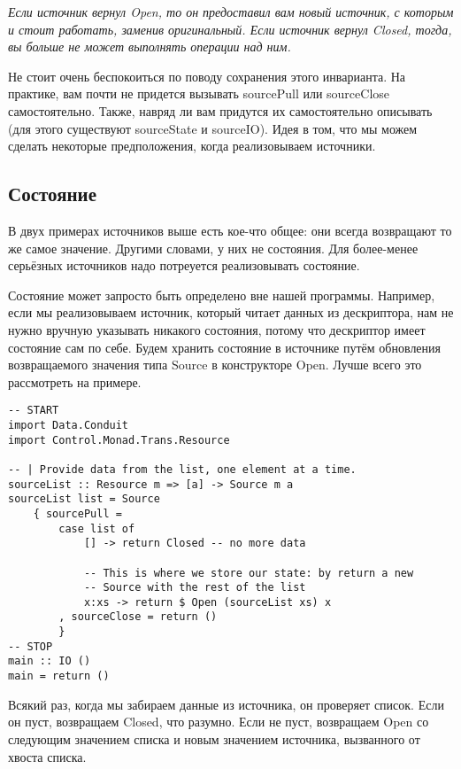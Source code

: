     
\textit{Если источник вернул Open, то он предоставил вам новый источник, с которым и
стоит работать, заменив оригинальный. Если источник вернул Closed, тогда, вы больше не
может выполнять операции над ним.}
    
Не стоит очень беспокоиться по поводу сохранения этого инварианта. На практике, вам почти
не придется вызывать sourcePull или sourceClose самостоятельно. Также, навряд ли вам
придутся их самостоятельно описывать (для этого существуют sourceState и sourceIO).
Идея в том, что мы можем сделать некоторые предположения, когда реализовываем источники. 
 

\subsection{Состояние}

В двух примерах источников выше есть кое-что общее: они всегда возвращают то же самое
значение. Другими словами, у них не состояния. Для более-менее серьёзных источников надо
потреуется реализовывать состояние.

Состояние может запросто быть определено вне нашей программы. Например, если мы
реализовываем источник, который читает данных из дескриптора, нам не нужно вручную
указывать никакого состояния, потому что дескриптор имеет состояние сам по себе.
Будем хранить состояние в источнике путём обновления возвращаемого значения типа Source в
конструкторе Open. Лучше всего это рассмотреть на примере.

\begin{lstlisting}
-- START
import Data.Conduit
import Control.Monad.Trans.Resource

-- | Provide data from the list, one element at a time.
sourceList :: Resource m => [a] -> Source m a
sourceList list = Source
    { sourcePull =
        case list of
            [] -> return Closed -- no more data

            -- This is where we store our state: by return a new
            -- Source with the rest of the list
            x:xs -> return $ Open (sourceList xs) x
        , sourceClose = return ()
        }
-- STOP
main :: IO ()
main = return ()
\end{lstlisting}

Всякий раз, когда мы забираем данные из источника, он проверяет список. Если он пуст,
возвращаем Closed, что разумно. Если не пуст, возвращаем Open со следующим значением
списка и новым значением источника, вызванного от хвоста списка.

